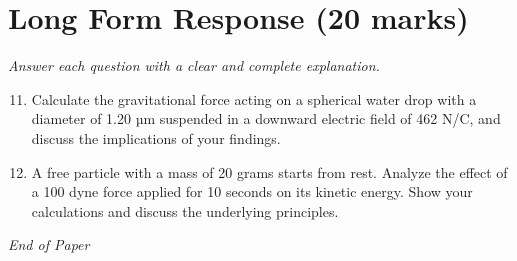 \documentclass[12pt]{article}
\begin{document}
\section*{Long Form Response (20 marks)}
\textit{Answer each question with a clear and complete explanation.}
\begin{enumerate}[label=\arabic*.]
\setcounter{enumi}{10}
\item Calculate the gravitational force acting on a spherical water drop with a diameter of 1.20 µm suspended in a downward electric field of 462 N/C, and discuss the implications of your findings.
\item A free particle with a mass of 20 grams starts from rest. Analyze the effect of a 100 dyne force applied for 10 seconds on its kinetic energy. Show your calculations and discuss the underlying principles.
\end{enumerate}

\vfill
\noindent\textit{End of Paper}
\end{document}
